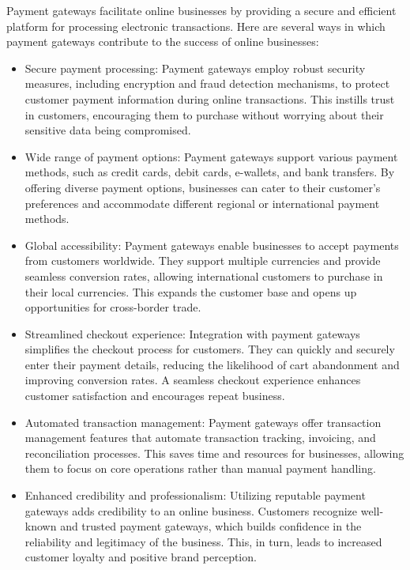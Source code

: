\begin{enumerate}
Payment gateways facilitate online businesses by providing a secure and efficient platform for processing electronic transactions. Here are several ways in which payment gateways contribute to the success of online businesses:
\begin{itemize}

    \item Secure payment processing: Payment gateways employ robust security measures, including encryption and fraud detection mechanisms, to protect customer payment information during online transactions. This instills trust in customers, encouraging them to purchase without worrying about their sensitive data being compromised.

    \item Wide range of payment options: Payment gateways support various payment methods, such as credit cards, debit cards, e-wallets, and bank transfers. By offering diverse payment options, businesses can cater to their customer's preferences and accommodate different regional or international payment methods.

    \item Global accessibility: Payment gateways enable businesses to accept payments from customers worldwide. They support multiple currencies and provide seamless conversion rates, allowing international customers to purchase in their local currencies. This expands the customer base and opens up opportunities for cross-border trade.

    \item Streamlined checkout experience: Integration with payment gateways simplifies the checkout process for customers. They can quickly and securely enter their payment details, reducing the likelihood of cart abandonment and improving conversion rates. A seamless checkout experience enhances customer satisfaction and encourages repeat business.

    \item Automated transaction management: Payment gateways offer transaction management features that automate transaction tracking, invoicing, and reconciliation processes. This saves time and resources for businesses, allowing them to focus on core operations rather than manual payment handling.

    \item Enhanced credibility and professionalism: Utilizing reputable payment gateways adds credibility to an online business. Customers recognize well-known and trusted payment gateways, which builds confidence in the reliability and legitimacy of the business. This, in turn, leads to increased customer loyalty and positive brand perception.


\end{itemize}
\end{enumerate}
